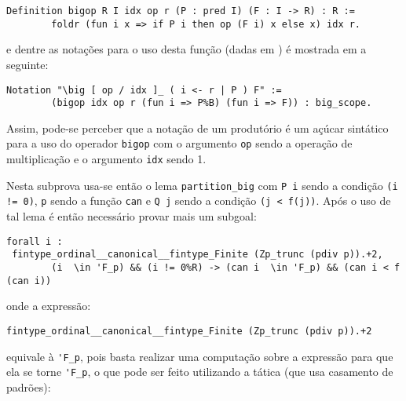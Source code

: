 \begin{enumerate}[label=\textbf{\roman*.}]
\begin{enumerate}[listparindent=\parindent]
                        \begin{lstlisting}[language=coq,frame=single,tabsize=1]
Definition bigop R I idx op r (P : pred I) (F : I -> R) : R :=
        foldr (fun i x => if P i then op (F i) x else x) idx r.
                        \end{lstlisting}
                e dentre as notações para o uso desta função (dadas em \cite{mathcomp-bigop}) é mostrada em \cite{assia_mahboubi_2022_7118596} a seguinte:

                        \begin{lstlisting}[language=coq,frame=single,tabsize=1]
Notation "\big [ op / idx ]_ ( i <- r | P ) F" :=
        (bigop idx op r (fun i => P%B) (fun i => F)) : big_scope.
                        \end{lstlisting}
                Assim, pode-se perceber que a notação de um produtório é um açúcar sintático para a uso do operador \lstinline[language=coq]|bigop| com o argumento \lstinline[language=coq]|op| sendo a operação de multiplicação e o argumento \lstinline[language=coq]|idx| sendo 1. 
                
                Nesta subprova usa-se então o lema \lstinline[language=coq]|partition_big| com \lstinline[language=coq]|P i| sendo a condição \lstinline[language=coq]|(i != 0)|, \lstinline[language=coq]|p| sendo a função \lstinline[language=coq]|can| e \lstinline[language=coq]|Q j| sendo a condição \lstinline[language=coq]|(j < f(j))|. Após o uso de tal lema é então necessário provar mais um subgoal:
                        \begin{lstlisting}[language=coq,frame=single,tabsize=1]
forall i : 
 fintype_ordinal__canonical__fintype_Finite (Zp_trunc (pdiv p)).+2,
        (i  \in 'F_p) && (i != 0%R) -> (can i  \in 'F_p) && (can i < f (can i))
                        \end{lstlisting}
                onde a expressão:
                
                        \begin{lstlisting}[language=coq,frame=single,tabsize=1]
fintype_ordinal__canonical__fintype_Finite (Zp_trunc (pdiv p)).+2
                        \end{lstlisting}
                equivale à \lstinline[language=coq]|'F_p|, pois basta realizar uma computação sobre a expressão para que ela se torne \lstinline[language=coq]|'F_p|, o que pode ser feito utilizando a tática (que usa casamento de padrões):


\end{enumerate}
\end{enumerate}
